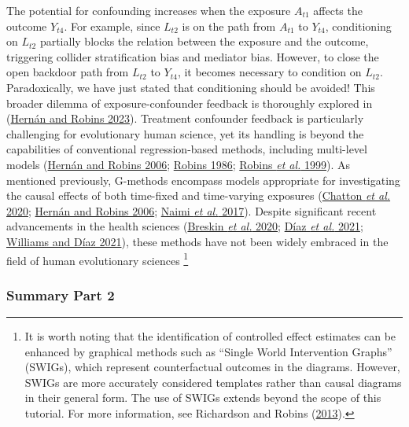 \documentclass[
  singlecolumn]{article}
\begin{document}
The potential for confounding increases when the exposure \(A_{t1}\)
affects the outcome \(Y_{t4}\). For example, since \(L_{t2}\) is on the
path from \(A_{t1}\) to \(Y_{t4}\), conditioning on \(L_{t2}\) partially
blocks the relation between the exposure and the outcome, triggering
collider stratification bias and mediator bias. However, to close the
open backdoor path from \(L_{t2}\) to \(Y_{t4}\), it becomes necessary
to condition on \(L_{t2}\). Paradoxically, we have just stated that
conditioning should be avoided! This broader dilemma of
exposure-confounder feedback is thoroughly explored in
(\protect\hyperlink{ref-hernuxe1n2023}{Hernán and Robins 2023}).
Treatment confounder feedback is particularly challenging for
evolutionary human science, yet its handling is beyond the capabilities
of conventional regression-based methods, including multi-level models
(\protect\hyperlink{ref-hernuxe1n2006}{Hernán and Robins 2006};
\protect\hyperlink{ref-robins1986}{Robins 1986};
\protect\hyperlink{ref-robins1999}{Robins \emph{et al.} 1999}). As
mentioned previously, G-methods encompass models appropriate for
investigating the causal effects of both time-fixed and time-varying
exposures (\protect\hyperlink{ref-chatton2020}{Chatton \emph{et al.}
2020}; \protect\hyperlink{ref-hernuxe1n2006}{Hernán and Robins 2006};
\protect\hyperlink{ref-naimi2017}{Naimi \emph{et al.} 2017}). Despite
significant recent advancements in the health sciences
(\protect\hyperlink{ref-breskin2020}{Breskin \emph{et al.} 2020};
\protect\hyperlink{ref-duxedaz2021}{Díaz \emph{et al.} 2021};
\protect\hyperlink{ref-williams2021}{Williams and Díaz 2021}), these
methods have not been widely embraced in the field of human evolutionary
sciences \footnote{It is worth noting that the identification of
  controlled effect estimates can be enhanced by graphical methods such
  as ``Single World Intervention Graphs'' (SWIGs), which represent
  counterfactual outcomes in the diagrams. However, SWIGs are more
  accurately considered templates rather than causal diagrams in their
  general form. The use of SWIGs extends beyond the scope of this
  tutorial. For more information, see Richardson and Robins
  (\protect\hyperlink{ref-richardson2013}{2013}).}

\hypertarget{summary-part-2}{%
\subsubsection{Summary Part 2}\label{summary-part-2}}
\end{document}
